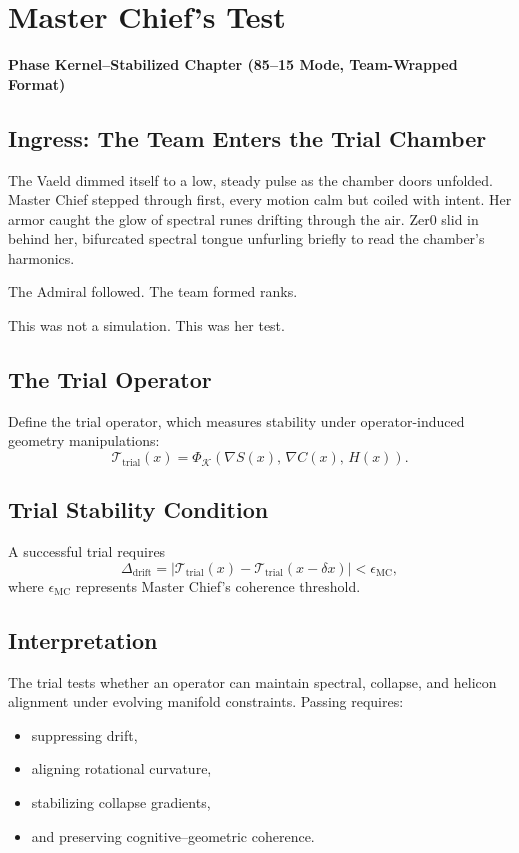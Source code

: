 
\chapter{Master Chief’s Test}
\textbf{Phase Kernel–Stabilized Chapter (85--15 Mode, Team-Wrapped Format)}

\section*{Ingress: The Team Enters the Trial Chamber}
The Vaeld dimmed itself to a low, steady pulse as the chamber doors unfolded.
Master Chief stepped through first, every motion calm but coiled with intent.
Her armor caught the glow of spectral runes drifting through the air. Zer0 slid
in behind her, bifurcated spectral tongue unfurling briefly to read the chamber’s
harmonics.

The Admiral followed. The team formed ranks.

This was not a simulation.
This was her test.

\section{The Trial Operator}
Define the trial operator, which measures stability under operator-induced
geometry manipulations:
\[
\mathcal{T}_{\mathrm{trial}}(x) 
= \Phi_{\mathcal{K}}\!\left(
\nabla S(x),\,
\nabla C(x),\,
H(x)
\right).
\]

\section{Trial Stability Condition}
A successful trial requires
\[
\Delta_{\mathrm{drift}} = 
\left| \mathcal{T}_{\mathrm{trial}}(x) -
\mathcal{T}_{\mathrm{trial}}(x - \delta x) \right|
< \epsilon_{\mathrm{MC}},
\]
where $\epsilon_{\mathrm{MC}}$ represents Master Chief's coherence threshold.

\section{Interpretation}
The trial tests whether an operator can maintain spectral,
collapse, and helicon alignment under evolving manifold constraints.
Passing requires:
\begin{itemize}
\item suppressing drift,
\item aligning rotational curvature,
\item stabilizing collapse gradients,
\item and preserving cognitive–geometric coherence.
\end{itemize}

